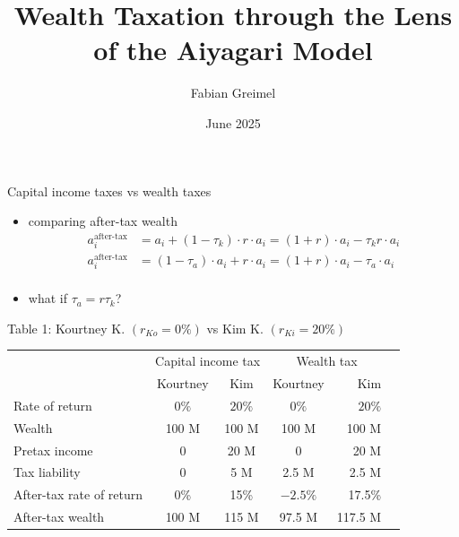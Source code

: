 \documentclass[aspectratio=169,mathserif]{beamer}
\title{Wealth Taxation through the Lens of the Aiyagari Model}
\author{Fabian Greimel}
\date{June 2025}
\begin{document}
\frame{\titlepage}

\section{\citet{guvenen2023use}}

\begin{frame}{Capital income taxes vs wealth taxes}
    \begin{itemize}
        \item comparing after-tax wealth
        \begin{align*}
            a_{i}^{\text{after-tax}} &= a_{i} + (1 - \tau_{k}) \cdot r \cdot a_{i} = (1+r)\cdot a_i - \tau_{k} r \cdot a_{i}\\
            a_{i}^{\text{after-tax}} &= (1 - \tau_{a}) \cdot a_{i} + r \cdot a_{i} = (1+r) \cdot a_i - \tau_{a} \cdot a_{i}\\
        \end{align*}
        \item what if $\tau_a = r \tau_k$?
    \end{itemize}
\end{frame}

\begin{frame}{Table 1: Kourtney K. $(r_{Ko} = 0\%)$ vs Kim K. $(r_{Ki} = 20\%)$}
    \begin{table}
        \centering
        \begin{tabular}{lcccrr}
            \toprule
            & \multicolumn{2}{c}{Capital income tax} & \multicolumn{2}{c}{Wealth tax} \\
            \cmidrule(lr){2-3} \cmidrule(lr){4-5}
            & Kourtney & Kim & Kourtney & Kim \\
            \midrule
            Rate of return & $0\%$ & $20\%$ & $0\%$ & $20\%$ \\
            Wealth & 100 M & 100 M & 100 M & 100 M \\
            Pretax income & 0 & 20 M & 0 & 20 M \\
            Tax liability & 0 & 5 M & 2.5 M & 2.5 M \\
            After-tax rate of return & 0\% & 15\% & $-2.5\%$ & 17.5\% \\
            After-tax wealth & 100 M & 115 M & 97.5 M & 117.5 M \\
            \bottomrule
        \end{tabular}
    \end{table}

   \centering {}
\end{frame}
\end{document}
